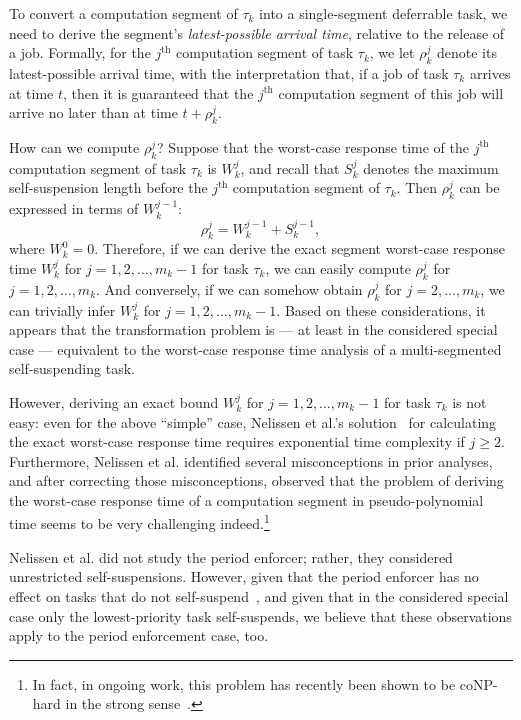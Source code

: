 To  convert a computation segment of $\tau_k$ into a single-segment deferrable task, we need to derive the segment's \emph{latest-possible arrival time}, relative to the release of a job. Formally,  for the $j^{\mathrm{th}}$ computation segment of task $\tau_k$, we let $\rho_k^j$ denote its latest-possible arrival time, with the interpretation that, if a job of task $\tau_k$ arrives at time $t$, then  it is guaranteed that the $j^{\mathrm{th}}$ computation segment of this job will arrive no later than at time $t+\rho_k^j$.

How can we compute $\rho_k^j$? Suppose that the worst-case response time of the $j^{\mathrm{th}}$ computation segment of task $\tau_k$ is $W_k^j$, and recall that $S_k^{j}$ denotes the maximum self-suspension length before the $j^{\mathrm{th}}$ computation segment of $\tau_k$. Then $\rho_k^j$ can be expressed in terms of $W_k^{j-1}$:
$$
	\rho_k^j = W_k^{j-1}+S_k^{j-1},
$$
where $W_k^0 = 0$.  Therefore, if we can derive the exact segment worst-case response time $W_k^j$ for $j=1,2,\ldots,m_k-1$ for task $\tau_k$, we can easily compute $\rho_k^j$  for $j=1,2,\ldots,m_k$. And conversely, if we can somehow obtain $\rho_k^j$  for $j=2,\ldots,m_k$, we  can trivially infer $W_k^j$ for $j=1,2,\ldots,m_k-1$.
Based on these considerations, it appears that the transformation problem is  --- at least in the considered special case --- equivalent to the  worst-case response time analysis of a multi-segmented self-suspending task. 

However, deriving an exact bound $W_k^j$ for $j=1,2,\ldots,m_k-1$ for task $\tau_k$ is not easy: 
even for the above ``simple'' case, Nelissen et al.'s solution~\cite{ecrts15nelissen} for calculating the exact worst-case response time requires exponential time complexity if $j \geq 2$. Furthermore, Nelissen et al. \cite{ecrts15nelissen} identified several misconceptions in prior analyses, and after correcting those misconceptions, observed that the problem of deriving the worst-case response time of a computation segment in pseudo-polynomial time seems to be very challenging indeed.\footnote{In fact, in ongoing work, this problem has recently been shown to be coNP-hard in the strong sense~\cite{Chen2016b}.}

Nelissen et al. \cite{ecrts15nelissen} did not study the period enforcer; rather, they considered unrestricted self-suspensions. However, given that the period enforcer has no effect on tasks that do not self-suspend~\cite{Raj:suspension1991}, and given that in the considered special case only the lowest-priority task self-suspends, we believe that these observations apply to the period enforcement case, too.

